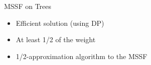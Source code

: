 \begin{frame}[<+->]{MSSF on Trees}
\begin{itemize}
  \item Efficient solution (using DP)
  \item At least 1/2 of the weight
  \item 1/2-approximation algorithm to the MSSF 
\end{itemize}
\centering

\end{frame}